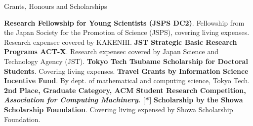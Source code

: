 \begin{rubric}{Grants, Honours and Scholarships}

  \entry*[2021] \textbf{Research Fellowship for Young Scientists (JSPS DC2)}.
  Fellowship from the Japan Society for the Promotion of Science (JSPS), covering
  living expenses. Research expensec covered by KAKENHI.
  \entry*[2020] \textbf{JST Strategic Basic Research Programs ACT-X}. Research
  expensec covered by Japan Science and Technology Agency (JST).
  \entry*[2020] \textbf{Tokyo Tech Tsubame Scholarship for Doctoral
    Students}. Covering living expenses.
  \entry*[2019] \textbf{Travel Grants by Information Science Incentive Fund}. By
  dept. of mathematical and computing science, Tokyo Tech.
  \entry*[2019] \textbf{2nd Place, Graduate Category, ACM Student Research
    Competition, \textit{Association for Computing Machinery}. [*]}
  \entry*[2014] \textbf{Scholarship by the Showa Scholarship Foundation}. Covering
  living expensed by Showa Scholarship Foundation.
\end{rubric}